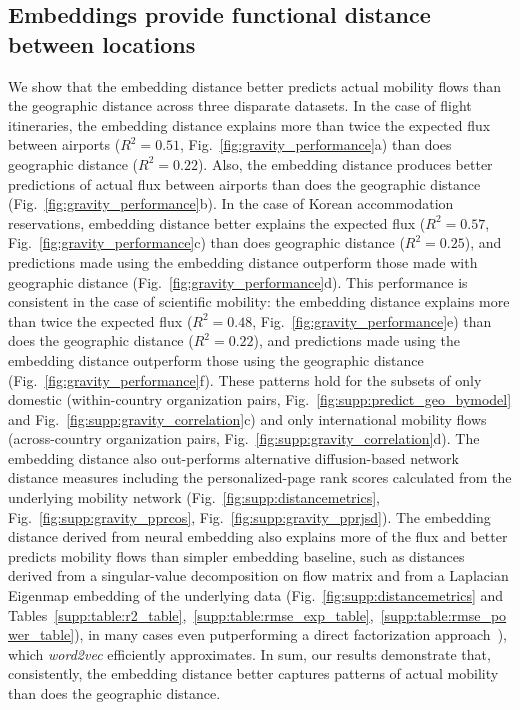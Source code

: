 \documentclass[12pt]{article} %
\begin{document}
%
%
%
\subsection*{Embeddings provide functional distance between locations}

We show that the embedding distance better predicts actual mobility flows than the geographic distance across three disparate datasets.
In the case of flight itineraries, the embedding distance explains more than twice the expected flux between airports ($R^{2} = 0.51$, Fig.~\ref{fig:gravity_performance}a) than does geographic distance ($R^{2} = 0.22$).  Also, the embedding distance produces better predictions of actual flux between airports than does the geographic distance (Fig.~\ref{fig:gravity_performance}b).
In the case of Korean accommodation reservations, embedding distance better explains the expected flux ($R^{2} = 0.57$, Fig.~\ref{fig:gravity_performance}c) than does geographic distance ($R^{2} = 0.25$), and predictions made using the embedding distance outperform those made with geographic distance (Fig.~\ref{fig:gravity_performance}d).
This performance is consistent in the case of scientific mobility:
the embedding distance explains more than twice the expected flux ($R^{2} = 0.48$, Fig.~\ref{fig:gravity_performance}e) than does the geographic distance ($R^{2} = 0.22$), and predictions made using the embedding distance outperform those using the geographic distance (Fig.~\ref{fig:gravity_performance}f).
These patterns hold for the subsets of only domestic (within-country organization pairs, Fig.~\ref{fig:supp:predict_geo_bymodel} and Fig.~\ref{fig:supp:gravity_correlation}c) and only international mobility flows (across-country organization pairs, Fig.~\ref{fig:supp:gravity_correlation}d).
The embedding distance also out-performs alternative diffusion-based network distance measures including the personalized-page rank scores  calculated from the underlying mobility network (Fig.~\ref{fig:supp:distancemetrics}, Fig.~\ref{fig:supp:gravity_pprcos}, Fig.~\ref{fig:supp:gravity_pprjsd}).
The embedding distance derived from neural embedding also explains more of the flux and better predicts mobility flows than simpler embedding baseline, such as distances derived from a singular-value decomposition on flow matrix and from a Laplacian Eigenmap embedding  \autocite{belkin2003laplacian} of the underlying data (Fig.~\ref{fig:supp:distancemetrics} and Tables~\ref{supp:table:r2_table},~\ref{supp:table:rmse_exp_table},~\ref{supp:table:rmse_power_table}), in many cases even putperforming a direct factorization approach~\cite{levy2014neural}), which \textit{word2vec} efficiently approximates.
In sum, our results demonstrate that, consistently, the embedding distance better captures patterns of actual mobility than does the geographic distance.
\end{document}
